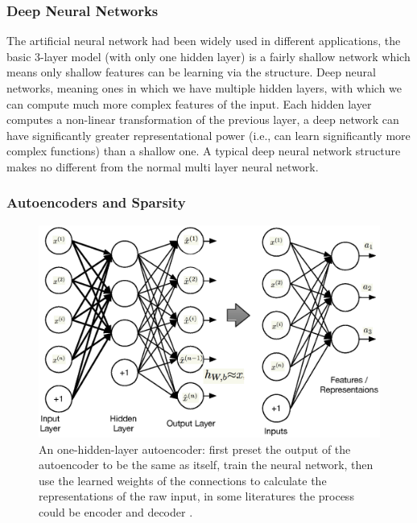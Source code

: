 \documentclass[journal]{IEEEtran}
\begin{document}
\subsubsection{Deep Neural Networks}
The artificial neural network had been widely used in different applications, the basic 3-layer model (with only one hidden layer) is a fairly shallow network which means only shallow features can be learning via the structure. Deep neural networks, meaning ones in which we have multiple hidden layers, with which we can compute much more complex features of the input. Each hidden layer computes a non-linear transformation of the previous layer, a deep network can have significantly greater representational power (i.e., can learn significantly more complex functions) than a shallow one. A typical deep neural network structure makes no different from the normal multi layer neural network.




\subsubsection{Autoencoders and Sparsity}
\begin{figure}[]
\centering
\includegraphics[width=3.2 in]{Figure1}
\caption{An one-hidden-layer autoencoder: first preset the output of the autoencoder to be the same as itself, train the neural network, then use the learned weights of the connections to calculate the representations of the raw input, in some literatures the process could be encoder and decoder \cite{bengio2009}.}
\label{figure1}
\end{figure}
\end{document}
